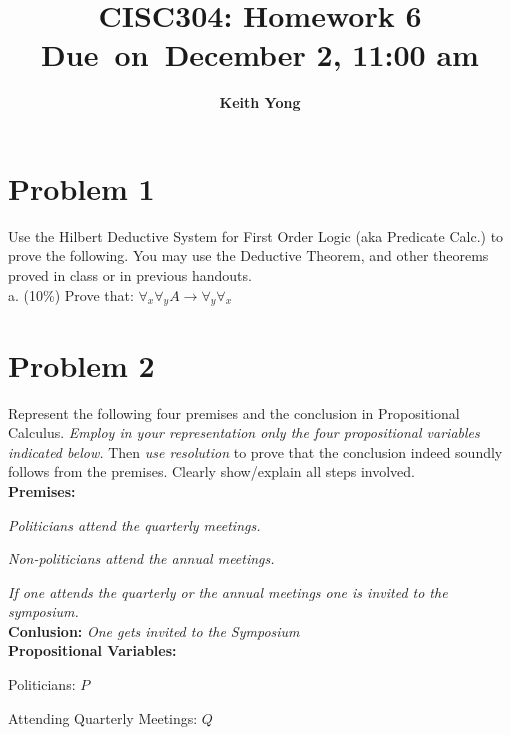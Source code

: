 \documentclass{article}
\title{
	\vspace{2in}
	\textmd{\textbf{CISC304: Homework 6}}\\
	\normalsize\vspace{0.1in}\small{Due\ on\ December 2, 11:00 am}\\
	\vspace{3in}
}
\author{\textbf{Keith Yong}}
\date{}
\begin{document}
\maketitle
\pagebreak

\section*{Problem 1}
Use the Hilbert Deductive System for First Order Logic (aka Predicate Calc.) to prove the following. You may use the Deductive Theorem, and other theorems proved in class or in previous handouts.\\

a. (10\%) Prove that: $\forall_{x}\forall_{y}A \rightarrow \forall_{y}\forall_{x}$
\pagebreak


\section*{Problem 2}
Represent the following four premises and the conclusion in Propositional Calculus. \emph{Employ in your representation only the four propositional variables indicated below.} Then \emph{use resolution} to prove that the conclusion indeed soundly follows from the premises. Clearly show/explain all steps involved.\\

\textbf{Premises:}

\emph{Politicians attend the quarterly meetings.}

\emph{Non-politicians attend the annual meetings.}

\emph{If one attends the quarterly or the annual meetings one is invited to the symposium.}\\

\textbf{Conlusion:}\emph{ One gets invited to the Symposium}\\

\textbf{Propositional Variables:}

Politicians: $P$

Attending Quarterly Meetings: $Q$
\end{document}

